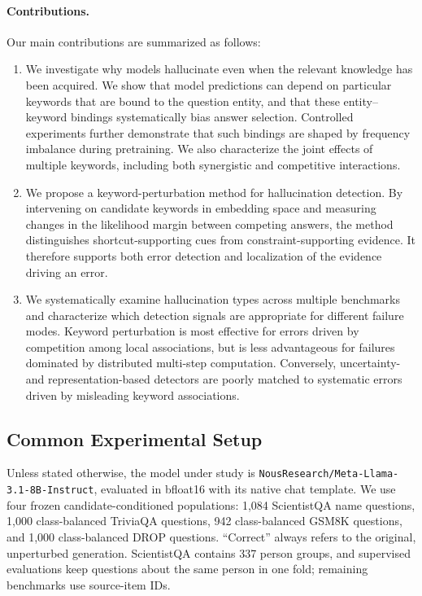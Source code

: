 \paragraph{Contributions.}
Our main contributions are summarized as follows:
\begin{enumerate}
    \item We investigate why models hallucinate even when the relevant knowledge has been acquired.  We show that model predictions can depend on particular keywords that are bound to the question entity, and that these entity--keyword bindings systematically bias answer selection.  Controlled experiments further demonstrate that such bindings are shaped by frequency imbalance during pretraining.  We also characterize the joint effects of multiple keywords, including both synergistic and competitive interactions.
    \item We propose a keyword-perturbation method for hallucination detection.  By intervening on candidate keywords in embedding space and measuring changes in the likelihood margin between competing answers, the method distinguishes shortcut-supporting cues from constraint-supporting evidence.  It therefore supports both error detection and localization of the evidence driving an error.
    \item We systematically examine hallucination types across multiple benchmarks and characterize which detection signals are appropriate for different failure modes.  Keyword perturbation is most effective for errors driven by competition among local associations, but is less advantageous for failures dominated by distributed multi-step computation.  Conversely, uncertainty- and representation-based detectors are poorly matched to systematic errors driven by misleading keyword associations.
\end{enumerate}

\iffalse
\subsection{Common Experimental Setup}
\label{sec:common-setup}
Unless stated otherwise, the model under study is
\texttt{NousResearch/Meta-Llama-3.1-8B-Instruct}, evaluated in bfloat16 with
its native chat template. We use four frozen candidate-conditioned populations:
1,084 ScientistQA name questions, 1,000 class-balanced TriviaQA questions, 942
class-balanced GSM8K questions, and 1,000 class-balanced DROP questions.
``Correct'' always refers to the original, unperturbed generation. ScientistQA
contains 337 person groups, and supervised evaluations keep questions about
the same person in one fold; remaining benchmarks use source-item IDs.

